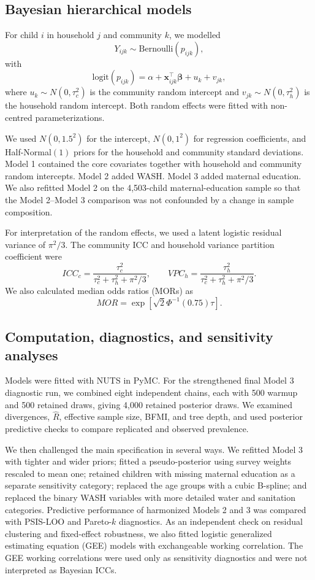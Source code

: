 \documentclass[11pt]{article}
\begin{document}
\subsection{Bayesian hierarchical models}

For child $i$ in household $j$ and community $k$, we modelled
\[
Y_{ijk}\sim\text{Bernoulli}(p_{ijk}),
\]
with
\[
\text{logit}(p_{ijk})
=
\alpha+\mathbf{x}_{ijk}^{\top}\boldsymbol{\beta}+u_k+v_{jk},
\]
where $u_k\sim N(0,\tau_c^2)$ is the community random intercept and $v_{jk}\sim N(0,\tau_h^2)$ is the household random intercept. Both random effects were fitted with non-centred parameterizations.

We used $N(0,1.5^2)$ for the intercept, $N(0,1^2)$ for regression coefficients, and Half-Normal$(1)$ priors for the household and community standard deviations. Model 1 contained the core covariates together with household and community random intercepts. Model 2 added WASH. Model 3 added maternal education. We also refitted Model 2 on the 4,503-child maternal-education sample so that the Model 2--Model 3 comparison was not confounded by a change in sample composition.

For interpretation of the random effects, we used a latent logistic residual variance of $\pi^2/3$. The community ICC and household variance partition coefficient were
\[
ICC_c=
\frac{\tau_c^2}{\tau_c^2+\tau_h^2+\pi^2/3},
\qquad
VPC_h=
\frac{\tau_h^2}{\tau_c^2+\tau_h^2+\pi^2/3}.
\]
We also calculated median odds ratios (MORs) as
\[
MOR=\exp\left[\sqrt{2}\Phi^{-1}(0.75)\tau\right].
\]

\subsection{Computation, diagnostics, and sensitivity analyses}

Models were fitted with NUTS in PyMC. For the strengthened final Model 3 diagnostic run, we combined eight independent chains, each with 500 warmup and 500 retained draws, giving 4,000 retained posterior draws. We examined divergences, $\hat R$, effective sample size, BFMI, and tree depth, and used posterior predictive checks to compare replicated and observed prevalence.

We then challenged the main specification in several ways. We refitted Model 3 with tighter and wider priors; fitted a pseudo-posterior using survey weights rescaled to mean one; retained children with missing maternal education as a separate sensitivity category; replaced the age groups with a cubic B-spline; and replaced the binary WASH variables with more detailed water and sanitation categories. Predictive performance of harmonized Models 2 and 3 was compared with PSIS-LOO and Pareto-$k$ diagnostics. As an independent check on residual clustering and fixed-effect robustness, we also fitted logistic generalized estimating equation (GEE) models with exchangeable working correlation. The GEE working correlations were used only as sensitivity diagnostics and were not interpreted as Bayesian ICCs.
\end{document}
